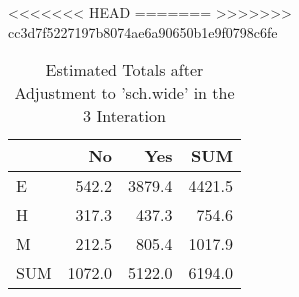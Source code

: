 <<<<<<< HEAD
=======
>>>>>>> cc3d7f5227197b8074ae6a90650b1e9f0798c6fe
\begin{table}[ht]
\centering
\caption{Estimated Totals after Adjustment to 'sch.wide' in the 3 Interation} 
\begin{tabular}{l|rr|r}
  & No & Yes & SUM \\ 
  \hline
E & 542.2 & 3879.4 & 4421.5 \\ 
  H & 317.3 & 437.3 & 754.6 \\ 
  M & 212.5 & 805.4 & 1017.9 \\ 
   \hline
SUM & 1072.0 & 5122.0 & 6194.0 \\ 
  \end{tabular}
\end{table}
